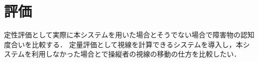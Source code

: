 \section{評価}
%
定性評価として実際に本システムを用いた場合とそうでない場合で障害物の認知度合いを比較する．
定量評価として視線を計算できるシステムを導入し，本システムを利用しなかった場合とで操縦者の視線の移動の仕方を比較したい．
